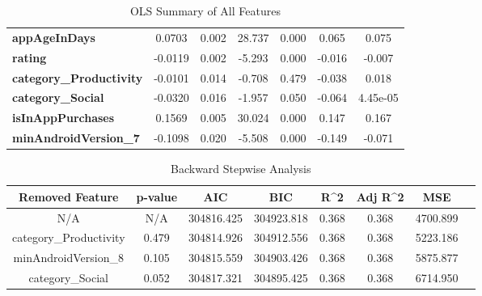 \begin{center}
\begin{table}
\begin{tabular}{lcccccc}
\textbf{appAgeInDays}           &       0.0703  &        0.002     &    28.737  &         0.000        &        0.065    &        0.075     \\
\textbf{rating}                 &      -0.0119  &        0.002     &    -5.293  &         0.000        &       -0.016    &       -0.007     \\
\textbf{category\_Productivity} &      -0.0101  &        0.014     &    -0.708  &         0.479        &       -0.038    &        0.018     \\
\textbf{category\_Social}       &      -0.0320  &        0.016     &    -1.957  &         0.050        &       -0.064    &     4.45e-05     \\
\textbf{isInAppPurchases}       &       0.1569  &        0.005     &    30.024  &         0.000        &        0.147    &        0.167     \\
\textbf{minAndroidVersion\_7}   &      -0.1098  &        0.020     &    -5.508  &         0.000        &       -0.149    &       -0.071     \\
\bottomrule
\end{tabular}
\caption{OLS Summary of All Features}
\label{tab:ols-1}
\end{table}
\end{center}

\begin{center}
    \begin{table}[]
        \centering
            \begin{tabular}{cccccccc}
                \hline
                 Removed Feature & p-value & AIC & BIC & R^2 & Adj R^2 & MSE \\
                \hline
                N/A & N/A & 304816.425 & 304923.818 & 0.368 & 0.368 & 4700.899 \\
                category\_Productivity & 0.479 & 304814.926 & 304912.556 & 0.368 & 0.368 & 5223.186 \\
                minAndroidVersion\_8 & 0.105 & 304815.559 & 304903.426 & 0.368 & 0.368 & 5875.877 \\
                category\_Social & 0.052 & 304817.321 & 304895.425 & 0.368 & 0.368 & 6714.950 \\
                \hline
            \end{tabular}
        \caption{Backward Stepwise Analysis}
        \label{tab:backwise}
    \end{table}
\end{center}


